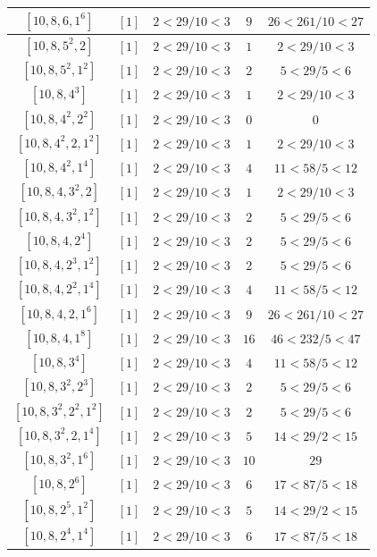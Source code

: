 \documentclass{article}%
\begin{document}
\begin{center}
\begin{longtable}{||c|c|c|c|c||}
$[10, 8, 6, 1^{6}]$ & $[1]$ & $2 < 29/10 < 3$ & $9$ & $26 < 261/10 < 27$ \\ \hline 
$[10, 8, 5^{2}, 2]$ & $[1]$ & $2 < 29/10 < 3$ & $1$ & $2 < 29/10 < 3$ \\ \hline 
$[10, 8, 5^{2}, 1^{2}]$ & $[1]$ & $2 < 29/10 < 3$ & $2$ & $5 < 29/5 < 6$ \\ \hline 
$[10, 8, 4^{3}]$ & $[1]$ & $2 < 29/10 < 3$ & $1$ & $2 < 29/10 < 3$ \\ \hline 
$[10, 8, 4^{2}, 2^{2}]$ & $[1]$ & $2 < 29/10 < 3$ & $0$ & $0$ \\ \hline 
$[10, 8, 4^{2}, 2, 1^{2}]$ & $[1]$ & $2 < 29/10 < 3$ & $1$ & $2 < 29/10 < 3$ \\ \hline 
$[10, 8, 4^{2}, 1^{4}]$ & $[1]$ & $2 < 29/10 < 3$ & $4$ & $11 < 58/5 < 12$ \\ \hline 
$[10, 8, 4, 3^{2}, 2]$ & $[1]$ & $2 < 29/10 < 3$ & $1$ & $2 < 29/10 < 3$ \\ \hline 
$[10, 8, 4, 3^{2}, 1^{2}]$ & $[1]$ & $2 < 29/10 < 3$ & $2$ & $5 < 29/5 < 6$ \\ \hline 
$[10, 8, 4, 2^{4}]$ & $[1]$ & $2 < 29/10 < 3$ & $2$ & $5 < 29/5 < 6$ \\ \hline 
$[10, 8, 4, 2^{3}, 1^{2}]$ & $[1]$ & $2 < 29/10 < 3$ & $2$ & $5 < 29/5 < 6$ \\ \hline 
$[10, 8, 4, 2^{2}, 1^{4}]$ & $[1]$ & $2 < 29/10 < 3$ & $4$ & $11 < 58/5 < 12$ \\ \hline 
$[10, 8, 4, 2, 1^{6}]$ & $[1]$ & $2 < 29/10 < 3$ & $9$ & $26 < 261/10 < 27$ \\ \hline 
$[10, 8, 4, 1^{8}]$ & $[1]$ & $2 < 29/10 < 3$ & $16$ & $46 < 232/5 < 47$ \\ \hline 
$[10, 8, 3^{4}]$ & $[1]$ & $2 < 29/10 < 3$ & $4$ & $11 < 58/5 < 12$ \\ \hline 
$[10, 8, 3^{2}, 2^{3}]$ & $[1]$ & $2 < 29/10 < 3$ & $2$ & $5 < 29/5 < 6$ \\ \hline 
$[10, 8, 3^{2}, 2^{2}, 1^{2}]$ & $[1]$ & $2 < 29/10 < 3$ & $2$ & $5 < 29/5 < 6$ \\ \hline 
$[10, 8, 3^{2}, 2, 1^{4}]$ & $[1]$ & $2 < 29/10 < 3$ & $5$ & $14 < 29/2 < 15$ \\ \hline 
$[10, 8, 3^{2}, 1^{6}]$ & $[1]$ & $2 < 29/10 < 3$ & $10$ & $29$ \\ \hline 
$[10, 8, 2^{6}]$ & $[1]$ & $2 < 29/10 < 3$ & $6$ & $17 < 87/5 < 18$ \\ \hline 
$[10, 8, 2^{5}, 1^{2}]$ & $[1]$ & $2 < 29/10 < 3$ & $5$ & $14 < 29/2 < 15$ \\ \hline 
$[10, 8, 2^{4}, 1^{4}]$ & $[1]$ & $2 < 29/10 < 3$ & $6$ & $17 < 87/5 < 18$ \\ \hline 

\end{longtable}
\end{center}
\end{document}
